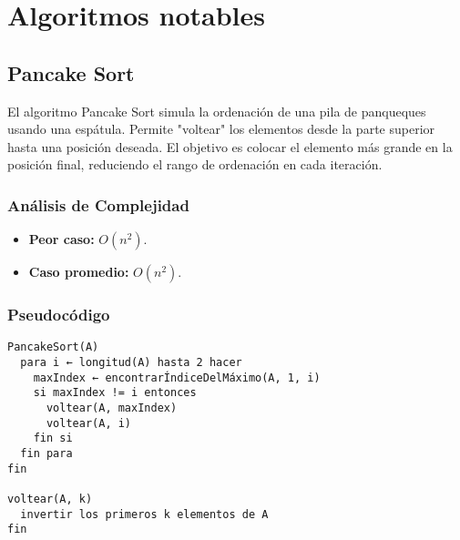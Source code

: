 \documentclass[11pt,openany]{book}
\begin{document}
\section{Algoritmos notables}
\subsection{Pancake Sort}
El algoritmo Pancake Sort simula la ordenación de una pila de panqueques usando una espátula. Permite "voltear" los elementos desde la parte superior hasta una posición deseada. El objetivo es colocar el elemento más grande en la posición final, reduciendo el rango de ordenación en cada iteración.

\subsubsection{Análisis de Complejidad}
\begin{itemize}
    \item \textbf{Peor caso:} $O(n^2)$.
    \item \textbf{Caso promedio:} $O(n^2)$.
\end{itemize}

\subsubsection{Pseudocódigo}
\begin{verbatim}
PancakeSort(A)
  para i ← longitud(A) hasta 2 hacer
    maxIndex ← encontrarÍndiceDelMáximo(A, 1, i)
    si maxIndex != i entonces
      voltear(A, maxIndex)
      voltear(A, i)
    fin si
  fin para
fin

voltear(A, k)
  invertir los primeros k elementos de A
fin
\end{verbatim}
\end{document}
